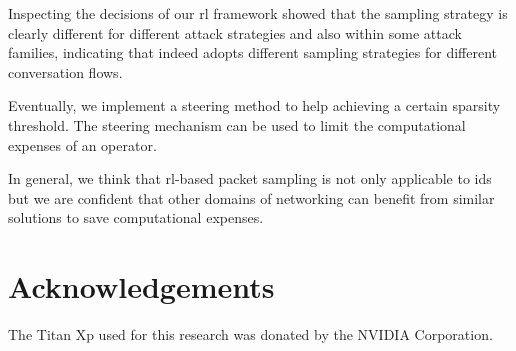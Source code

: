 \documentclass[conference]{IEEEtran}
\begin{document}
Inspecting the decisions of our \gls{rl} framework showed that the sampling strategy is clearly different for different attack strategies and also within some attack families, indicating that \ours{} indeed adopts different sampling strategies for different conversation flows.

Eventually, we implement a steering method to help achieving a certain sparsity threshold. The steering mechanism can be used to limit the computational expenses of an operator.

In general, we think that \gls{rl}-based packet sampling is not only applicable to \gls{ids} but we are confident that other domains of networking can benefit from similar solutions to save computational expenses.

\section*{Acknowledgements}
The Titan Xp used for this research was donated by the NVIDIA Corporation.

\renewcommand*{\bibfont}{\small}


\end{document}
